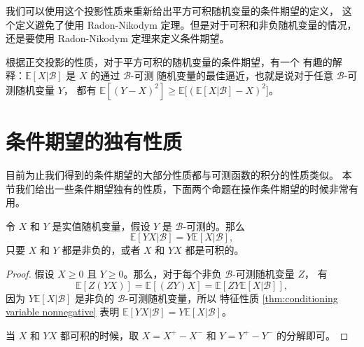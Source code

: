 \begin{remark}
  我们可以使用这个投影性质来重新给出平方可积随机变量的条件期望的定义，
  这个定义避免了使用 Radon-Nikodym 定理。但是对于可积和非负随机变量的情况，
  还是要使用 Radon-Nikodym 定理来定义条件期望。
\end{remark}

根据正交投影的性质，对于平方可积的随机变量的条件期望，有一个
有趣的解释：$\mathbb{E}[X|\mathcal{B}]$ 是 $X$ 的通过 $\mathcal{B}$-可测
随机变量的最佳逼近，也就是说对于任意 $\mathcal{B}$-可测随机变量 $Y$，
都有 $\mathbb{E}[(Y-X)^2]\geq \mathbb{E}\bigl[(\mathbb{E}[X|\mathcal{B}]-X)^2\bigr]$。



\section{条件期望的独有性质}

目前为止我们得到的条件期望的大部分性质都与可测函数的积分的性质类似。
本节我们给出一些条件期望独有的性质，下面两个命题在操作条件期望的时候非常有用。

\begin{proposition}
  令 $X$ 和 $Y$ 是实值随机变量，假设 $Y$ 是 $\mathcal{B}$-可测的。那么
  \[
    \mathbb{E}[YX|\mathcal{B}]=Y\mathbb{E}[X|\mathcal{B}],
  \]
  只要 $X$ 和 $Y$ 都是非负的，或者 $X$ 和 $YX$ 都是可积的。
\end{proposition}
\begin{proof}
  假设 $X\geq 0$ 且 $Y\geq 0$。那么，对于每个非负 $\mathcal{B}$-可测随机变量 $Z$，
  有
  \[
    \mathbb{E}[Z(YX)]=\mathbb{E}[(ZY)X]=\mathbb{E}[ZY\mathbb{E}[X|\mathcal{B}]],
  \]
  因为 $Y \mathbb{E}[X|\mathcal{B}]$ 是非负的 $\mathcal{B}$-可测随机变量，所以
  特征性质 \autoref{thm:conditioning variable nonnegative} 表明
  $\mathbb{E}[YX|\mathcal{B}]=Y \mathbb{E}[X|\mathcal{B}]$。

  当 $X$ 和 $YX$ 都可积的时候，取 $X=X^+-X^-$ 和 $Y=Y^+-Y^-$ 的分解即可。
\end{proof}


